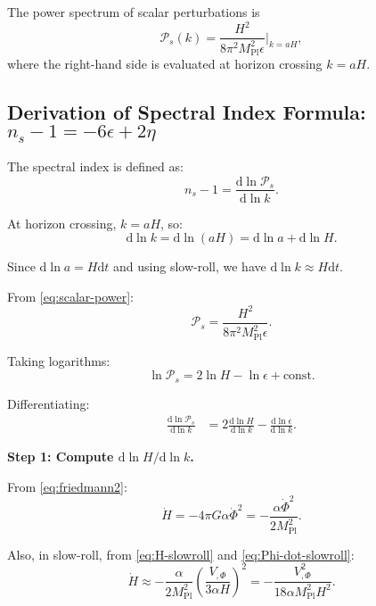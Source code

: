 \documentclass[11pt,a4paper]{article}
\numberwithin{equation}{section}
\theoremstyle{plain}
\theoremstyle{definition}
\theoremstyle{remark}
\newcommand{\dd}{\mathrm{d}}
\begin{document}
The power spectrum of scalar perturbations is
\begin{equation}
\mathcal{P}_s(k) = \frac{H^2}{8\pi^2 M_{\mathrm{Pl}}^2\epsilon}\Bigg|_{k=aH},
\label{eq:scalar-power}
\end{equation}
where the right-hand side is evaluated at horizon crossing $k = aH$.

\subsection{Derivation of Spectral Index Formula: $n_s - 1 = -6\epsilon + 2\eta$}

The spectral index is defined as:
\begin{equation}
n_s - 1 = \frac{\dd \ln \mathcal{P}_s}{\dd \ln k}.
\label{eq:ns-def}
\end{equation}

At horizon crossing, $k = aH$, so:
\begin{equation}
\dd\ln k = \dd\ln(aH) = \dd\ln a + \dd\ln H.
\end{equation}

Since $\dd\ln a = H\dd t$ and using slow-roll, we have $\dd\ln k \approx H\dd t$.

From \eqref{eq:scalar-power}:
\begin{equation}
\mathcal{P}_s = \frac{H^2}{8\pi^2 M_{\mathrm{Pl}}^2\epsilon}.
\end{equation}

Taking logarithms:
\begin{equation}
\ln\mathcal{P}_s = 2\ln H - \ln\epsilon + \text{const}.
\end{equation}

Differentiating:
\begin{align}
\frac{\dd\ln\mathcal{P}_s}{\dd\ln k} &= 2\frac{\dd\ln H}{\dd\ln k} - \frac{\dd\ln\epsilon}{\dd\ln k}.
\label{eq:ns-step1}
\end{align}

\textbf{Step 1: Compute $\dd\ln H/\dd\ln k$.}

From \eqref{eq:friedmann2}:
\begin{equation}
\dot{H} = -4\pi G\alpha\dot{\Phi}^2 = -\frac{\alpha\dot{\Phi}^2}{2M_{\mathrm{Pl}}^2}.
\end{equation}

Also, in slow-roll, from \eqref{eq:H-slowroll} and \eqref{eq:Phi-dot-slowroll}:
\begin{equation}
\dot{H} \approx -\frac{\alpha}{2M_{\mathrm{Pl}}^2}\left(\frac{V_{,\Phi}}{3\alpha H}\right)^2 = -\frac{V_{,\Phi}^2}{18\alpha M_{\mathrm{Pl}}^2 H^2}.
\end{equation}
\end{document}
